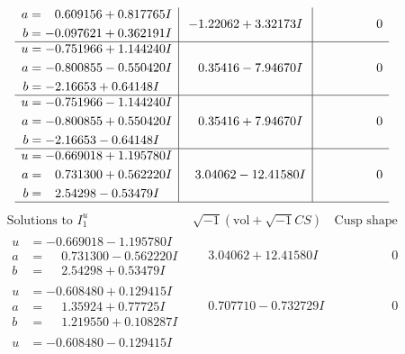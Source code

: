 \documentclass[1p]{elsarticle_modified}
\theoremstyle{definition}
\newcommand{\I}{\sqrt{-1}}
\begin{document}
$$\begin{array}{c|c|c}
\begin{aligned}
a &= \phantom{-}0.609156 + 0.817765 I \\
b &= -0.097621 + 0.362191 I\end{aligned}
 & -1.22062 + 3.32173 I & \phantom{-0.000000 } 0 \\ \hline\begin{aligned}
u &= -0.751966 + 1.144240 I \\
a &= -0.800855 - 0.550420 I \\
b &= -2.16653 + 0.64148 I\end{aligned}
 & \phantom{-}0.35416 - 7.94670 I & \phantom{-0.000000 } 0 \\ \hline\begin{aligned}
u &= -0.751966 - 1.144240 I \\
a &= -0.800855 + 0.550420 I \\
b &= -2.16653 - 0.64148 I\end{aligned}
 & \phantom{-}0.35416 + 7.94670 I & \phantom{-0.000000 } 0 \\ \hline\begin{aligned}
u &= -0.669018 + 1.195780 I \\
a &= \phantom{-}0.731300 + 0.562220 I \\
b &= \phantom{-}2.54298 - 0.53479 I\end{aligned}
 & \phantom{-}3.04062 - 12.41580 I & \phantom{-0.000000 } 0\\
 \hline 
 \end{array}$$\newpage$$\begin{array}{c|c|c}  
\text{Solutions to }I^u_{1}& \I (\text{vol} + \sqrt{-1}CS) & \text{Cusp shape}\\
 \hline 
\begin{aligned}
u &= -0.669018 - 1.195780 I \\
a &= \phantom{-}0.731300 - 0.562220 I \\
b &= \phantom{-}2.54298 + 0.53479 I\end{aligned}
 & \phantom{-}3.04062 + 12.41580 I & \phantom{-0.000000 } 0 \\ \hline\begin{aligned}
u &= -0.608480 + 0.129415 I \\
a &= \phantom{-}1.35924 + 0.77725 I \\
b &= \phantom{-}1.219550 + 0.108287 I\end{aligned}
 & \phantom{-}0.707710 - 0.732729 I & \phantom{-0.000000 } 0 \\ \hline\begin{aligned}
u &= -0.608480 - 0.129415 I \\

\end{aligned}
\end{array}$$
\end{document}
